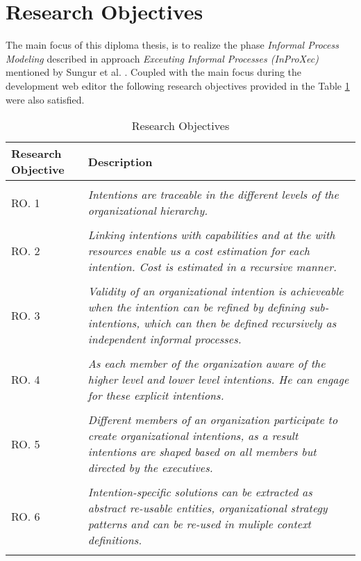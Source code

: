\section {Research Objectives}
\label{sec:researchobjectives}
The main focus of this diploma thesis, is to realize the phase \textit{Informal Process Modeling} described in approach \textit{Exceuting Informal Processes (InProXec)} mentioned by Sungur et al. \cite{Sungur2015}. Coupled with the main focus during the development web editor the following research objectives provided in the Table \ref{tab:researchobjectives} were also satisfied. 

\label{sec:researchobj}
\begin{center}
	\begin{longtable}{p{5cm}p{11cm}} 
   	\toprule 
	\textbf{Research Objective} & \textbf{Description} \\
	\midrule
	\endfirsthead
	\\
	RO. 1 & \textit{Intentions are traceable in the different levels of the organizational hierarchy. }  \label{ro1} \\
	\\[-1.5ex]
	RO. 2 & \textit{Linking intentions with capabilities and at the with resources enable us a cost estimation for each intention. Cost is estimated in a recursive manner.}  \label{ro2} \\
	\\[-1.5ex]
	RO. 3 & \textit{Validity of an organizational intention is achieveable when the intention can be refined by defining sub-intentions, which can then be defined recursively as independent informal processes.} \label{ro3}\\
	\\[-1.5ex]
	RO. 4 & \textit{As each member of the organization aware of the higher level and lower level intentions. He can engage for these explicit intentions. }  \label{ro4}\\
	\\[-1.5ex]
	RO. 5 & \textit{Different members of an organization participate to create organizational intentions, as a result intentions are shaped based on all members but directed by the executives.}\label{ro5}\\
	\\[-1.5ex]
	RO. 6 & \textit{Intention-specific solutions can be extracted as abstract re-usable entities, organizational strategy patterns and can be re-used in muliple context definitions.} \label{ro6}\\
	
	\bottomrule
	\caption{Research Objectives}
	\label{tab:researchobjectives}
	\end{longtable}	
\end{center}

